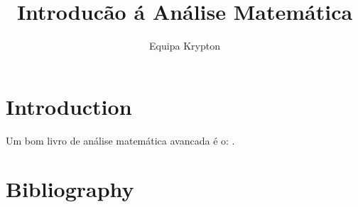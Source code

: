 \documentclass{article}
\title{Introducão á Análise Matemática}
\author{Equipa Krypton}
\theoremstyle{definition}
\theoremstyle{remark}
\begin{document}
\maketitle

\section{Introduction}

Um bom livro de análise matemática avancada é o:  \cite{friedman1970foundations}.


\newpage
\section*{Bibliography}
\printbibliography
\end{document}
